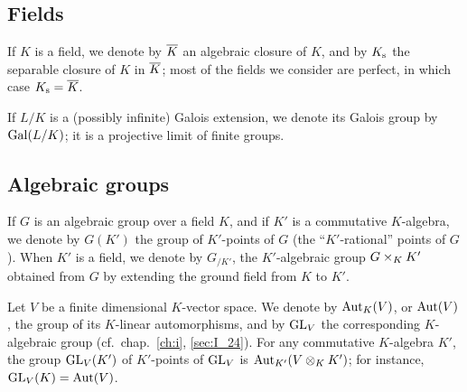 \subsection*{Fields}
If $K$ is a field, we denote by $\overline{K}$ an algebraic closure of $K$, and by
$K_{\mathrm{s}}$ the separable closure of $K$ in $\overline{K}$; most of the fields we
consider are perfect, in which case $K_{\mathrm{s}} = \overline{K}$.

If $L/K$ is a (possibly infinite) Galois extension, we denote its Galois group
by $\operatorname{Gal}(L/K)$; it is a projective limit of finite groups.

\subsection*{Algebraic groups}
If $G$ is an algebraic group over a field $K$, and if $K'$ is a commutative
$K$-algebra, we denote by $G(K')$ the group of $K'$-points of $G$ (the
``$K'$-rational'' points of $G$).
When $K'$ is a field, we denote by $G_{/K'}$, the $K'$-algebraic group $G
\times_K K'$ obtained from $G$ by extending the ground field from $K$ to
$K'$.

Let $V$ be a finite dimensional $K$-vector space. We denote by $\operatorname{Aut}_K(V)$, or
$\operatorname{Aut}(V)$, the group of its $K$-linear automorphisms, and by $\operatorname{GL}_V$ the
corresponding $K$-algebraic group (cf.\ chap.~\ref{ch:i}, \ref{sec:I_24}).
For any commutative $K$-algebra $K'$, the group $\operatorname{GL}_V(K')$ of
$K'$-points of $\operatorname{GL}_V$ is $\operatorname{Aut}_{K'}(V \otimes_K K')$; for instance,
$\operatorname{GL}_V(K) = \operatorname{Aut}(V)$.

